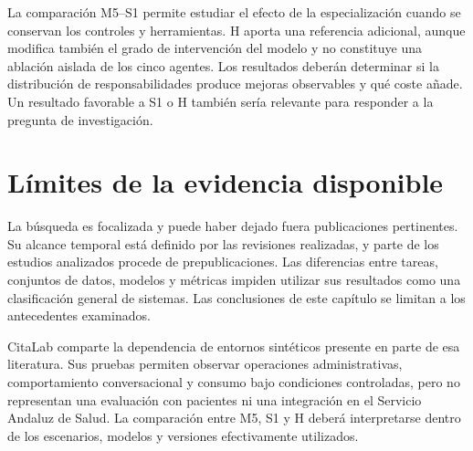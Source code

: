La comparación M5--S1 permite estudiar el efecto de la especialización cuando se conservan los controles y herramientas. H aporta una referencia adicional, aunque modifica también el grado de intervención del modelo y no constituye una ablación aislada de los cinco agentes. Los resultados deberán determinar si la distribución de responsabilidades produce mejoras observables y qué coste añade. Un resultado favorable a S1 o H también sería relevante para responder a la pregunta de investigación.

\section{Límites de la evidencia disponible}

La búsqueda es focalizada y puede haber dejado fuera publicaciones pertinentes. Su alcance temporal está definido por las revisiones realizadas, y parte de los estudios analizados procede de prepublicaciones. Las diferencias entre tareas, conjuntos de datos, modelos y métricas impiden utilizar sus resultados como una clasificación general de sistemas. Las conclusiones de este capítulo se limitan a los antecedentes examinados.

CitaLab comparte la dependencia de entornos sintéticos presente en parte de esa literatura. Sus pruebas permiten observar operaciones administrativas, comportamiento conversacional y consumo bajo condiciones controladas, pero no representan una evaluación con pacientes ni una integración en el Servicio Andaluz de Salud. La comparación entre M5, S1 y H deberá interpretarse dentro de los escenarios, modelos y versiones efectivamente utilizados.
